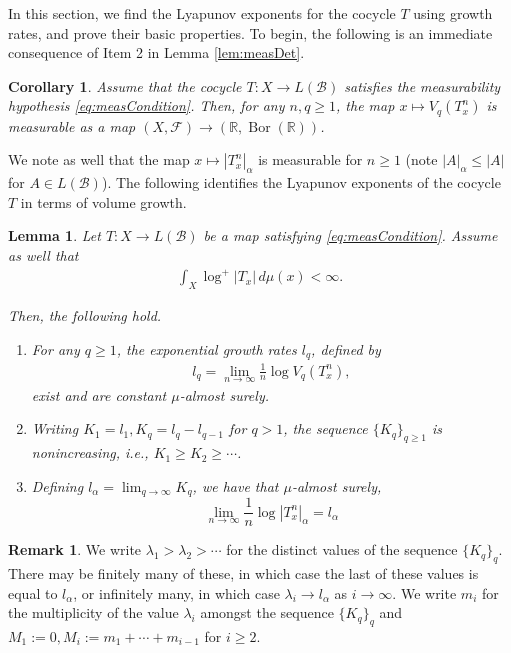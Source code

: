 \documentclass[11pt]{amsart}
\theoremstyle{theorem}
\newtheorem{cor}[thm]{Corollary}
\newtheorem{lem}[thm]{Lemma}
\theoremstyle{definition}
\newtheorem{rmk}[thm]{Remark}
\numberwithin{equation}{section}
\newcommand{\R}{\mathbb{R}}
\newcommand{\Fc}{\mathcal{F}}
\renewcommand{\a}{\alpha}
\renewcommand{\l}{\lambda}
\newcommand{\Bc}{\mathcal{B}}
\begin{document}
In this section, we find the Lyapunov exponents for the cocycle $T$ using growth rates, and prove their basic properties. To begin, the following is an immediate consequence of Item 2 in Lemma \ref{lem:measDet}.
\begin{cor} \label{cor:volGrowMeas}
Assume that the cocycle $T : X \to L(\Bc)$ satisfies the measurability hypothesis \eqref{eq:measCondition}. Then, for any $n, q \geq 1$, the map $x \mapsto V_q(T^n_x)$ is measurable as a map $(X, \Fc) \to (\R, \operatorname{Bor}(\R))$.
\end{cor}

\noindent We note as well that the map $x \mapsto |T^n_x|_\a$ is measurable for $n \geq 1$ (note $|A|_\a \leq |A|$ for $A \in L(\Bc)$). The following identifies the Lyapunov exponents of the cocycle $T$ in terms of volume growth.

\begin{lem}\label{lem:growthRate}
Let $T : X \to L(\Bc)$ be a map satisfying \eqref{eq:measCondition}. Assume as well that  
\begin{align}\label{eq:cocycleIntegrable}
\int_X \log^+ |T_x| \, d \mu(x) < \infty.
\end{align}

Then, the following hold.
\begin{enumerate}
\item For any $q \geq 1$, the exponential growth rates $l_q$, defined by
\begin{align} \label{eq:definitionLQ}
l_q = \lim_{n \to \infty} \frac{1}{n} \log V_q(T^n_x),
\end{align}
exist and are constant $\mu$-almost surely. 
\item Writing $K_1 = l_1, K_q = l_q - l_{q - 1}$ for $q > 1$, the sequence $\{K_q\}_{q \geq 1}$ is nonincreasing, i.e., $K_1 \geq K_2 \geq \cdots$.
\item Defining $l_{\a} = \lim_{q \to \infty} K_q $, we have that $\mu$-almost surely,
\[
 \lim_{n \to \infty} \frac{1}{n} \log |T^n_x|_{\a} = l_{\a}
\]
\end{enumerate}
\end{lem}

\begin{rmk}\label{rmk:exponents}
We write $\l_1 > \l_2 > \cdots$ for the distinct values of the sequence $\{K_q\}_q$. There may be finitely many of these, in which case the last of these values is equal to $l_{\a}$, or infinitely many, in which case $\l_i \to l_{\a}$ as $i \to \infty$. We write $m_i$ for the multiplicity of the value $\l_i$ amongst the sequence $\{K_q\}_q$ and $M_1 := 0, M_i := m_1 + \cdots + m_{i - 1}$ for $i \geq 2$.
\end{rmk}
\end{document}
